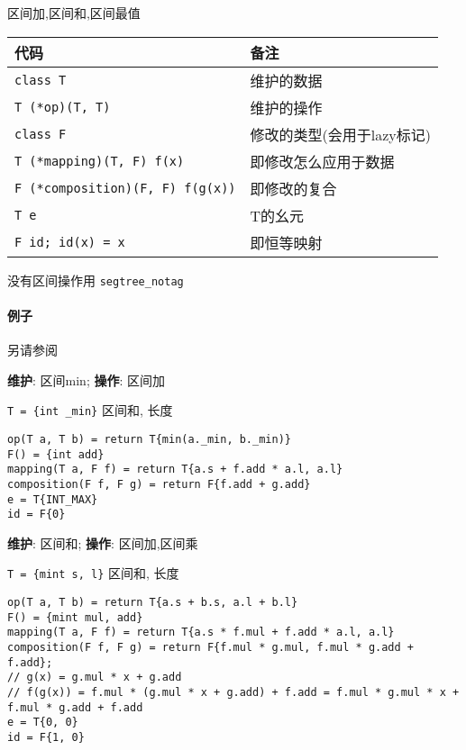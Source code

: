 区间加,区间和,区间最值

\begin{tabular}{ll}
    \hline
    代码                                    & 备注               \\
    \hline
    \verb|class T|                        & 维护的数据            \\
    \verb|T (*op)(T, T)|                  & 维护的操作            \\
    \verb|class F|                        & 修改的类型(会用于lazy标记) \\
    \verb|T (*mapping)(T, F) f(x)|        & 即修改怎么应用于数据       \\
    \verb|F (*composition)(F, F) f(g(x))| & 即修改的复合           \\
    \verb|T e|                            & T的幺元             \\
    \verb|F id; id(x) = x|                & 即恒等映射            \\
    \hline
\end{tabular}

没有区间操作用 \verb|segtree_notag|

\paragraph{例子}

另请参阅 

\textbf{维护}: 区间min; \textbf{操作}: 区间加

\verb|T = {int _min}| 区间和, 长度

\begin{verbatim}
op(T a, T b) = return T{min(a._min, b._min)}
F() = {int add}
mapping(T a, F f) = return T{a.s + f.add * a.l, a.l}
composition(F f, F g) = return F{f.add + g.add}
e = T{INT_MAX}
id = F{0}
\end{verbatim}

\textbf{维护}: 区间和; \textbf{操作}: 区间加,区间乘

\verb|T = {mint s, l}| 区间和, 长度

\begin{verbatim}
op(T a, T b) = return T{a.s + b.s, a.l + b.l}
F() = {mint mul, add}
mapping(T a, F f) = return T{a.s * f.mul + f.add * a.l, a.l}
composition(F f, F g) = return F{f.mul * g.mul, f.mul * g.add + f.add};
// g(x) = g.mul * x + g.add
// f(g(x)) = f.mul * (g.mul * x + g.add) + f.add = f.mul * g.mul * x + f.mul * g.add + f.add
e = T{0, 0}
id = F{1, 0}
\end{verbatim}
